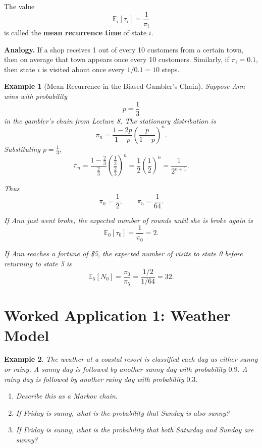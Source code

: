 \documentclass[12pt,a4paper]{article}
\theoremstyle{lecturestyle}
\newtheorem{example}{Example}
\newcommand{\E}{\mathbb{E}}
\begin{document}
The value
\[
\E_i[\tau_i]=\frac1{\pi_i}
\]
is called the \textbf{mean recurrence time} of state $i$.

\textbf{Analogy.} If a shop receives 1 out of every 10 customers from a certain town, then on average that town appears once every 10 customers. Similarly, if $\pi_i=0.1$, then state $i$ is visited about once every $1/0.1=10$ steps.

\begin{example}[Mean Recurrence in the Biased Gambler's Chain]
Suppose Ann wins with probability
\[
p=\frac13
\]
in the gambler's chain from Lecture 8. The stationary distribution is
\[
\pi_n=
\frac{1-2p}{1-p}
\left(\frac{p}{1-p}\right)^n.
\]
Substituting $p=\frac13$,
\[
\pi_n
=
\frac{1-\frac23}{\frac23}
\left(\frac{\frac13}{\frac23}\right)^n
=
\frac12\left(\frac12\right)^n
=
\frac{1}{2^{n+1}}.
\]

Thus
\[
\pi_0=\frac12,
\qquad
\pi_5=\frac1{64}.
\]

If Ann just went broke, the expected number of rounds until she is broke again is
\[
\E_0[\tau_0]=\frac1{\pi_0}=2.
\]

If Ann reaches a fortune of \$5, the expected number of visits to state 0 before returning to state 5 is
\[
\E_5[N_0]=\frac{\pi_0}{\pi_5}
=
\frac{1/2}{1/64}
=32.
\]
\end{example}

\section{Worked Application 1: Weather Model}

\begin{example}
The weather at a coastal resort is classified each day as either sunny or rainy. A sunny day is followed by another sunny day with probability $0.9$. A rainy day is followed by another rainy day with probability $0.3$.

\begin{enumerate}[label=(\alph*)]
    \item Describe this as a Markov chain.
    \item If Friday is sunny, what is the probability that Sunday is also sunny?
    \item If Friday is sunny, what is the probability that both Saturday and Sunday are sunny?
\end{enumerate}
\end{example}
\end{document}
